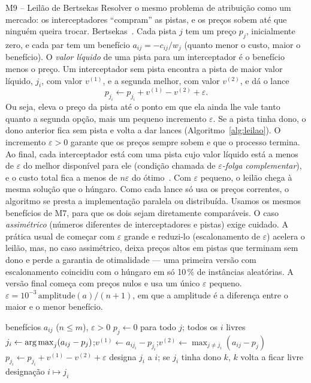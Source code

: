\begin{metodo}{M9 -- Leilão de Bertsekas}
\ideia Resolver o mesmo problema de atribuição como um mercado: os interceptadores ``compram'' as pistas, e os preços sobem
até que ninguém queira trocar.
\orig Bertsekas~\cite{bertsekas1988}.
\func Cada pista $j$ tem um preço $p_j$, inicialmente zero, e cada par tem um benefício $a_{ij}=-c_{ij}/w_j$ (quanto
menor o custo, maior o benefício). O \emph{valor líquido} de uma pista para um interceptador é o benefício menos o preço.
Um interceptador sem pista encontra a pista de maior valor líquido, $j_i$, com valor $v^{(1)}$, e a segunda melhor, com
valor $v^{(2)}$, e dá o lance
\begin{equation}
  p_{j_i}\leftarrow p_{j_i}+v^{(1)}-v^{(2)}+\varepsilon .
  \label{eq:lance}
\end{equation}
Ou seja, eleva o preço da pista até o ponto em que ela ainda lhe vale tanto quanto a segunda opção, mais um pequeno
incremento $\varepsilon$. Se a pista tinha dono, o dono anterior fica sem pista e volta a dar lances
(Algoritmo~\ref{alg:leilao}). O incremento $\varepsilon>0$ garante que os preços sempre sobem e que o processo termina.
\prop Ao final, cada interceptador está com uma pista cujo valor líquido está a menos de $\varepsilon$ do melhor
disponível para ele (condição chamada de \emph{$\varepsilon$-folga complementar}), e o custo total fica a menos de
$n\varepsilon$ do ótimo~\cite{bertsekas1988}. Com $\varepsilon$ pequeno, o leilão chega à mesma solução que o húngaro. Como
cada lance só usa os preços correntes, o algoritmo se presta a implementação paralela ou distribuída.
\adap Usamos os mesmos benefícios de M7, para que os dois sejam diretamente comparáveis. O caso \emph{assimétrico} (números
diferentes de interceptadores e pistas) exige cuidado. A prática usual de começar com $\varepsilon$ grande e reduzi-lo
(escalonamento de $\varepsilon$) acelera o leilão, mas, no caso assimétrico, deixa preços altos em pistas que terminam sem
dono e perde a garantia de otimalidade --- uma primeira versão com escalonamento coincidiu com o húngaro em só 10\,\% de
instâncias aleatórias. A versão final começa com preços nulos e usa um único $\varepsilon$ pequeno.
\parm $\varepsilon=10^{-3}\,\mathrm{amplitude}(a)/(n+1)$, em que a amplitude é a diferença entre o maior e o menor benefício.
\end{metodo}

\begin{algorithm}[H]
\caption{Leilão direto para atribuição assimétrica (M9).}\label{alg:leilao}
\begin{algorithmic}[1]
\Require benefícios $a_{ij}$ ($n\le m$), $\varepsilon>0$
\State $p_j\gets0$ para todo $j$; todos os $i$ livres
  \State $j_i\gets\operatorname*{arg\,max}_j(a_{ij}-p_j)$;\quad $v^{(1)}\gets a_{ij_i}-p_{j_i}$;\quad $v^{(2)}\gets\max_{j\ne j_i}(a_{ij}-p_j)$
  \State $p_{j_i}\gets p_{j_i}+v^{(1)}-v^{(2)}+\varepsilon$
  \State designa $j_i$ a $i$; se $j_i$ tinha dono $k$, $k$ volta a ficar livre
\EndWhile
\Ensure designação $i\mapsto j_i$
\end{algorithmic}
\end{algorithm}

